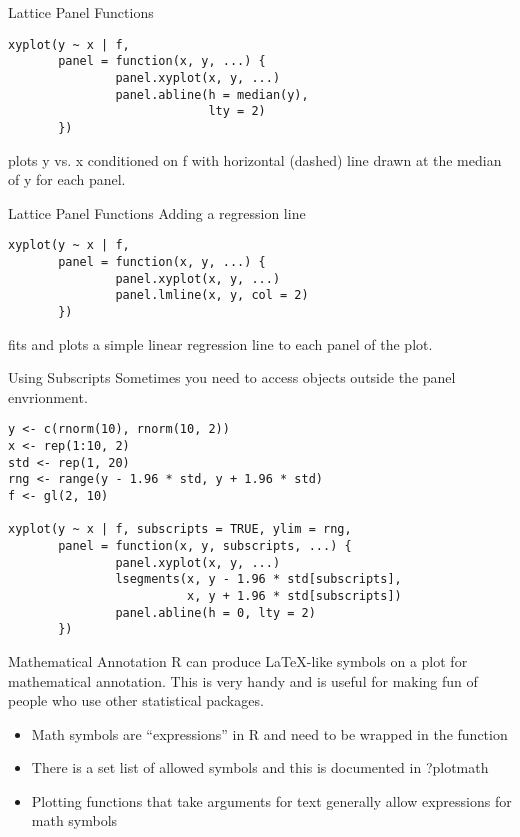 \documentclass[aspectratio=169]{beamer}
\begin{document}
\begin{frame}[fragile]{Lattice Panel Functions}
\begin{verbatim}
xyplot(y ~ x | f,
       panel = function(x, y, ...) {
               panel.xyplot(x, y, ...)
               panel.abline(h = median(y),
                            lty = 2)
       })
\end{verbatim}
plots y vs. x conditioned on f with horizontal (dashed) line drawn at
the median of y for each panel.
\end{frame}


\begin{frame}[fragile]{Lattice Panel Functions}
Adding a regression line
\begin{verbatim}
xyplot(y ~ x | f,
       panel = function(x, y, ...) {
               panel.xyplot(x, y, ...)
               panel.lmline(x, y, col = 2)
       })
\end{verbatim}
fits and plots a simple linear regression line to each panel of the
plot.
\end{frame}

\begin{frame}[fragile]{Using Subscripts}
Sometimes you need to access objects outside the panel envrionment.
\begin{verbatim}
y <- c(rnorm(10), rnorm(10, 2))
x <- rep(1:10, 2)
std <- rep(1, 20)
rng <- range(y - 1.96 * std, y + 1.96 * std)
f <- gl(2, 10)

xyplot(y ~ x | f, subscripts = TRUE, ylim = rng,
       panel = function(x, y, subscripts, ...) {
               panel.xyplot(x, y, ...)
               lsegments(x, y - 1.96 * std[subscripts],
                         x, y + 1.96 * std[subscripts])
               panel.abline(h = 0, lty = 2)
       })
\end{verbatim}
\end{frame}


\begin{frame}{Mathematical Annotation}
R can produce \LaTeX-like symbols on a plot for mathematical
annotation.  This is very handy and is useful for making fun of people
who use other statistical packages.
\begin{itemize}
\item
Math symbols are ``expressions'' in R and need to be wrapped in the
 function
\item
There is a set list of allowed symbols and this is documented in ?plotmath
\item
Plotting functions that take arguments for text generally allow
expressions for math symbols
\end{itemize}
\end{frame}
\end{document}
